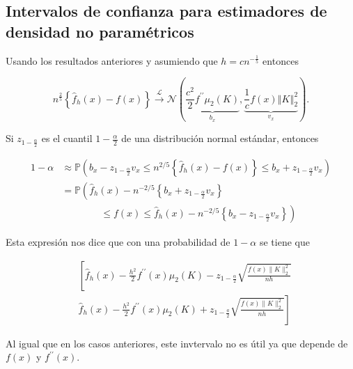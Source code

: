 \documentclass[
  12pt,
]{book}
\begin{document}
\hypertarget{intervalos-de-confianza-para-estimadores-de-densidad-no-paramuxe9tricos}{%
\subsection{Intervalos de confianza para estimadores de densidad no
paramétricos}\label{intervalos-de-confianza-para-estimadores-de-densidad-no-paramuxe9tricos}}

Usando los resultados anteriores y asumiendo que \(h=cn^{-\frac{1}{5}}\)
entonces

\begin{equation*}
n^{\frac{2}{5}} \left\{ \hat{f}_{h}(x) -f(x)\right\}
\xrightarrow{\mathcal{L}} \mathcal{N}\left(\underbrace{\frac{c^{2}}{2} f^{\prime\prime}
\mu_{2}(K)}_{b_{x}}, \underbrace{\frac{1}{c}f(x) \left\Vert K \right\Vert_{2}^{2}}_{v_{x}}\right).
\end{equation*}

Si \(z_{1-\frac{\alpha}{2}}\) es el cuantil \(1-\frac{\alpha}{2}\) de
una distribución normal estándar, entonces

\begin{align*}
1-\alpha
& \approx \mathbb{P}\left(b_{x}-z_{1-\frac{\alpha}{2}} v_{x} \leq n^{2 / 5}\left\{\widehat{f}_{h}(x)-f(x)\right\} \leq b_{x}+z_{1-\frac{\alpha}{2}} v_{x}\right) \\
& =\mathbb{P}\left(\widehat{f}_{h}(x)-n^{-2 / 5}\left\{b_{x}+z_{1-\frac{\alpha}{2}} v_{x}\right\}\right.                                                         \\
& \qquad\qquad \left. \leq f(x)\leq \hat{f}_{h}(x)-n^{-2 / 5}\left\{b_{x}-z_{1-\frac{\alpha}{2}} v_{x}\right\}\right)
\end{align*}

Esta expresión nos dice que con una probabilidad de \(1-\alpha\) se
tiene que

\begin{equation*}
\begin{aligned}
& \left[\hat{f}_{h}(x)-\frac{h^{2}}{2} f^{\prime \prime}(x) \mu_{2}(K)-z_{1-\frac{\alpha}{2}} \sqrt{\frac{f(x)\|K\|_{2}^{2}}{n h}}\right. \\
& \left.\widehat{f}_{h}(x)-\frac{h^{2}}{2} f^{\prime \prime}(x) \mu_{2}(K)+z_{1-\frac{a}{2}} \sqrt{\frac{f(x)\|K\|_{2}^{2}}{n h}}\right]
\end{aligned}
\end{equation*}

Al igual que en los casos anteriores, este invtervalo no es útil ya que
depende de \(f(x)\) y \(f^{\prime\prime} (x)\).
\end{document}
